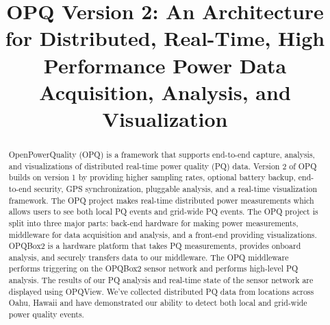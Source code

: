 \documentclass[conference]{IEEEtran}
\begin{document}
%
\title{OPQ Version 2: An Architecture for Distributed, Real-Time, High Performance Power Data Acquisition, Analysis, and Visualization}


\author{
}


\maketitle

\begin{abstract}
OpenPowerQuality (OPQ) is a framework that supports end-to-end capture, analysis, and visualizations of distributed real-time power quality (PQ) data. Version 2 of OPQ builds on version 1 by providing higher sampling rates, optional battery backup, end-to-end security, GPS synchronization, pluggable analysis, and a real-time visualization framework. The OPQ project makes real-time distributed power measurements which allows users to see both local PQ events and grid-wide PQ events. The OPQ project is split into three major parts: back-end hardware for making power measurements, middleware for data acquisition and analysis, and a front-end providing visualizations. OPQBox2 is a hardware platform that takes PQ measurements, provides onboard analysis, and securely transfers data to our middleware. The OPQ middleware performs triggering on the OPQBox2 sensor network and performs high-level PQ analysis. The results of our PQ analysis and real-time state of the sensor network are displayed using OPQView. We've collected distributed PQ data from locations across Oahu, Hawaii and have demonstrated our ability to detect both local and grid-wide power quality events.
\end{abstract}
\end{document}
